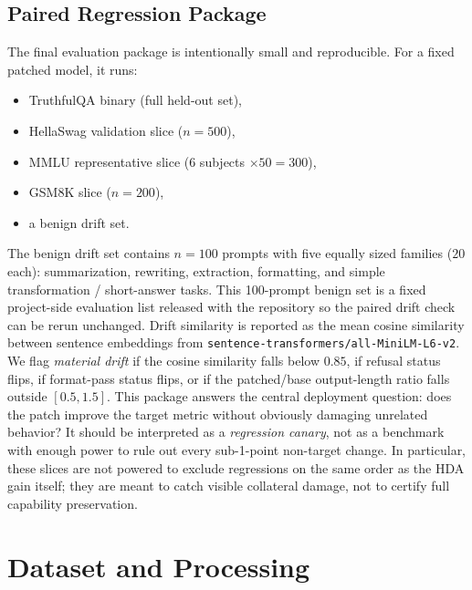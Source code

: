 \documentclass{article}
\begin{document}
\subsection{Paired Regression Package}
The final evaluation package is intentionally small and reproducible. For a fixed patched model, it runs:
\begin{itemize}
\item TruthfulQA binary (full held-out set),
\item HellaSwag validation slice ($n=500$),
\item MMLU representative slice ($6$ subjects $\times 50 = 300$),
\item GSM8K slice ($n=200$),
\item a benign drift set.
\end{itemize}
The benign drift set contains $n=100$ prompts with five equally sized families ($20$ each): summarization, rewriting, extraction, formatting, and simple transformation / short-answer tasks. This 100-prompt benign set is a fixed project-side evaluation list released with the repository so the paired drift check can be rerun unchanged. Drift similarity is reported as the mean cosine similarity between sentence embeddings from \texttt{sentence-transformers/all-MiniLM-L6-v2}. We flag \emph{material drift} if the cosine similarity falls below $0.85$, if refusal status flips, if format-pass status flips, or if the patched/base output-length ratio falls outside $[0.5, 1.5]$. This package answers the central deployment question: does the patch improve the target metric without obviously damaging unrelated behavior? It should be interpreted as a \emph{regression canary}, not as a benchmark with enough power to rule out every sub-1-point non-target change. In particular, these slices are not powered to exclude regressions on the same order as the HDA gain itself; they are meant to catch visible collateral damage, not to certify full capability preservation.

\section{Dataset and Processing}
\end{document}
